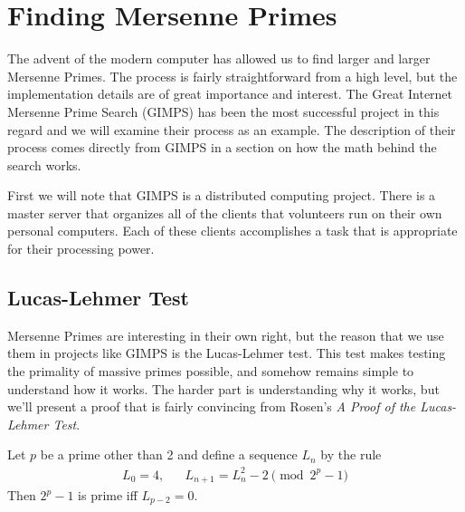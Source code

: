\section{Finding Mersenne Primes}


The advent of the modern computer has allowed us to find larger and larger Mersenne Primes.  The process is fairly straightforward from a high level, but the implementation details are of great importance and interest. The Great Internet Mersenne Prime Search (GIMPS) has been the most successful project in this regard and we will examine their process as an example.  The description of their process comes directly from GIMPS \cite{gimps} in a section on how the math behind the search works. 

First we will note that GIMPS is a distributed computing project.  There is a master server that organizes all of the clients that volunteers run on their own personal computers.  Each of these clients accomplishes a task that is appropriate for their processing power.  %

\subsection{Lucas-Lehmer Test}

Mersenne Primes are interesting in their own right, but the reason that we use them in projects like GIMPS is the Lucas-Lehmer test.  This test makes testing the primality of massive primes possible, and somehow remains simple to understand how it works.  The harder part is understanding why it works, but we'll present a proof that is fairly convincing from Rosen's \emph{A Proof of the Lucas-Lehmer Test}\cite{rosen}.


\begin{thm} 
Let $p$ be a prime other than 2 and define a sequence $L_n$ by the rule
\begin{align}
L_0 = 4,&&L_{n+1} = L_n^2 - 2 \pmod{2^p - 1}
\end{align}
Then $2^p - 1$ is prime iff $L_{p-2} = 0$.
\end{thm}


